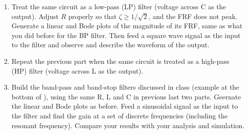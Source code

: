 \begin{enumerate}
\begin{comment}
  \end{comment}



\item Treat the same circuit as a low-pass (LP) filter (voltage across C as the output).
  Adjust $R$ properly so that $\zeta\ge 1/\sqrt{2}$, and the FRF does not peak. 
  Generate a linear and Bode plots of the magnitude of its FRF, same as what you did 
  before for the BP filter. Then feed a square wave signal as the input to the filter 
  and observe and describe the waveform of the output.


  \begin{comment}
  {\bf Solution:} Use $R=280\,\Omega$, $\zeta=(R_L+R)\sqrt{C/L}/2=0.708$
  \htmladdimg{../RLCfilterFig2.png}

  \end{comment}


\item Repeat the previous part when the same circuit is treated as a high-pass (HP) 
  filter (voltage across L as the output).

\item Build the band-pass and band-stop filters discussed in class 
  (example at the bottom of ),
  using the same R, L and C in previous last two parts. Geernate the linear and Bode plots 
  as before. Feed a sinusoidal signal as the input to the filter and find the gain at a
  set of discrete frequencies (including the resonant frequency). Compare your results 
  with your analysis and simulation.

  \begin{comment}

  \htmladdimg{../RLCfilterFig3.png}
  \end{comment}


\end{enumerate}

  
